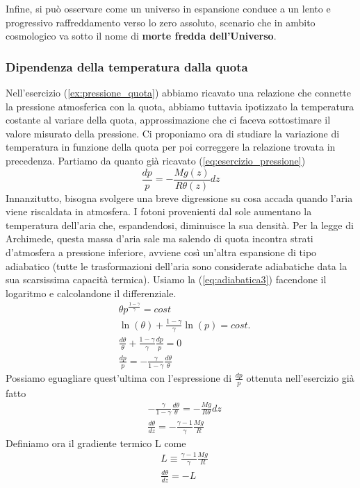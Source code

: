 \documentclass[10pt,a4paper]{article}
\begin{document}
\FloatBarrier
Infine, si può osservare come un universo in espansione conduce a un lento e progressivo
raffreddamento verso lo zero assoluto, scenario che in ambito cosmologico va sotto il nome
di\textbf{ morte fredda dell’Universo}.
\subsubsection{Dipendenza della temperatura dalla quota}
Nell'esercizio (\ref{ex:pressione_quota}) abbiamo ricavato una relazione che connette la pressione atmosferica con la quota, abbiamo tuttavia ipotizzato la temperatura costante al variare della quota, approssimazione che ci faceva sottostimare il valore misurato della pressione. Ci proponiamo ora di studiare la variazione di temperatura in funzione della quota per poi correggere la relazione trovata in precedenza. Partiamo da quanto già ricavato (\ref{eq:esercizio_pressione})
\[\frac{dp}{p} = -\frac{M g(z)}{R\theta(z)} dz\]
Innanzitutto, bisogna svolgere una breve digressione su cosa accada quando l'aria viene riscaldata in atmosfera. I fotoni provenienti dal sole aumentano la temperatura dell'aria che, espandendosi, diminuisce la sua densità. Per la legge di Archimede, questa massa d'aria sale ma salendo di quota incontra strati d'atmosfera a pressione inferiore, avviene così un'altra espansione di tipo adiabatico (tutte le trasformazioni dell'aria sono considerate adiabatiche data la sua scarsissima capacità termica). Usiamo la (\ref{eq:adiabatica3}) facendone il logaritmo e calcolandone il differenziale. 
\begin{align*}
	&\theta p^{\frac{1-\gamma}{\gamma}} = cost\\
	&\ln(\theta) + \frac{1-\gamma}{\gamma}\ln(p) = cost.\\
	&\frac{d\theta}{\theta}+\frac{1-\gamma}{\gamma}\frac{dp}{p} = 0\\
	&\frac{dp}{p} = -\frac{\gamma}{1-\gamma}\frac{d\theta}{\theta}
\end{align*}
Possiamo eguagliare quest'ultima con l'espressione di $\frac{dp}{p}$ ottenuta nell'esercizio già fatto
\begin{align*}
	&-\frac{\gamma}{1-\gamma}\frac{d\theta}{\theta} = -\frac{M g}{R \theta}dz\\
	&\frac{d\theta}{dz} = -\frac{\gamma - 1}{\gamma} \frac{M g}{R}
\end{align*}
Definiamo ora il gradiente termico L come
\begin{align*}
	&L \equiv \frac{\gamma - 1}{\gamma} \frac{M g}{R}\\
	&\frac{d\theta}{dz} = -L 
\end{align*}
\end{document}

